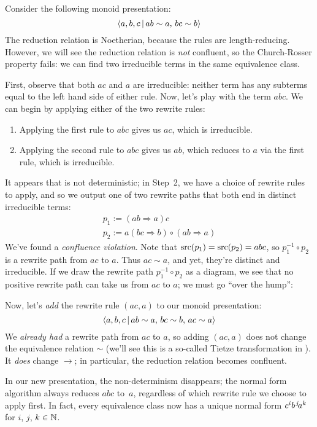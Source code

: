 \documentclass[../generics]{subfiles}
\begin{document}
\begin{example}\label{non confluent example}
Consider the following monoid presentation:
\[\langle a,b,c\,|\,ab\sim a,\,bc\sim b\rangle\]
The reduction relation is Noetherian, because the rules are length-reducing. However, we will see the reduction relation is \emph{not} confluent, so the Church-Rosser property fails: we can find two irreducible terms in the same equivalence class.

First, observe that both $ac$ and $a$ are irreducible: neither term has any subterms equal to the left hand side of either rule. Now, let's play with the term $abc$. We can begin by applying either of the two rewrite rules:
\begin{enumerate}
\item Applying the first rule to $abc$ gives us $ac$, which is irreducible.
\item Applying the second rule to $abc$ gives us $ab$, which reduces to $a$ via the first rule, which is irreducible.
\end{enumerate}
It appears that  is not deterministic; in Step~2, we have a choice of rewrite rules to apply, and so we output one of two rewrite paths that both end in distinct irreducible terms:
\begin{gather*}
p_1 := (ab\Rightarrow a)c\\
p_2 := a(bc\Rightarrow b)\circ(ab\Rightarrow a)
\end{gather*}
We've found a \emph{confluence violation}. Note that $\operatorname{src}(p_1)=\operatorname{src}(p_2)=abc$, so $p_1^{-1}\circ p_2$ is a rewrite path from $ac$ to $a$. Thus $ac\sim a$, and yet, they're distinct and irreducible. If we draw the rewrite path $p_1^{-1}\circ p_2$ as a diagram, we see that no positive rewrite path can take us from $ac$ to $a$; we must go ``over the hump'':
\begin{center}
\end{center}

Now, let's \emph{add} the rewrite rule $(ac,a)$ to our monoid presentation:
\[\langle a,b,c\,|\,ab\sim a,\,bc\sim b,\,ac\sim a\rangle\]
We \emph{already had} a rewrite path from $ac$ to $a$, so adding $(ac, a)$ does not change the equivalence relation $\sim$ (we'll see this is a so-called Tietze transformation in ). It \emph{does} change $\rightarrow$; in particular, the reduction relation becomes confluent.

In our new presentation, the non-determinism disappears; the normal form algorithm always reduces $abc$ to~$a$, regardless of which rewrite rule we choose to apply first. In fact, every equivalence class now has a unique normal form $c^i b^{\hspace{0.08em}j}\! a^k$ for $i$, $j$, $k\in\mathbb{N}$.
\end{example}
\end{document}
